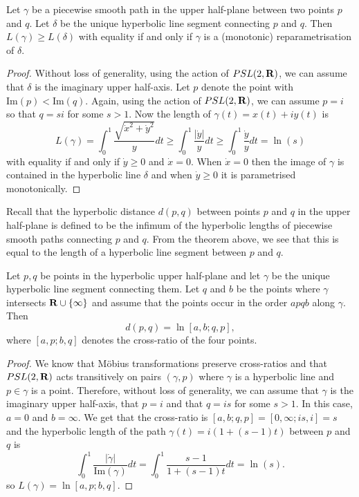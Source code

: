 \documentclass[12pt]{article}
\begin{document}
\begin{thm}
  Let $\gamma$ be a piecewise smooth path in the upper half-plane between two points $p$ and $q$. Let $\delta$ be the unique hyperbolic line segment connecting $p$ and $q$. Then $L(\gamma)\geq L(\delta)$ with equality if and only if $\gamma$ is a (monotonic) reparametrisation of $\delta$.
\end{thm}
\begin{proof}
  Without loss of generality, using the action of $PSL(2,\mathbf{R})$, we can assume that $\delta$ is the imaginary upper half-axis. Let $p$ denote the point with $\mathrm{Im}(p)<\mathrm{Im}(q)$. Again, using the action of $PSL(2,\mathbf{R})$, we can assume $p=i$ so that $q=si$ for some $s>1$. Now the length of $\gamma(t)=x(t)+iy(t)$ is
  \[L(\gamma)=\int_0^1\frac{\sqrt{\dot{x}^2+\dot{y}^2}}{y}dt\geq\int_0^1\frac{|\dot{y}|}{y}dt\geq\int_0^1\frac{\dot{y}}{y}dt=\ln(s)\]
  with equality if and only if $\dot{y}\geq 0$ and $\dot{x}=0$. When $\dot{x}=0$ then the image of $\gamma$ is contained in the hyperbolic line $\delta$ and when $\dot{y}\geq 0$ it is parametrised monotonically.
\end{proof}

Recall that the hyperbolic distance $d(p,q)$ between points $p$ and $q$ in the upper half-plane is defined to be the infimum of the hyperbolic lengths of piecewise smooth paths connecting $p$ and $q$. From the theorem above, we see that this is equal to the length of a hyperbolic line segment between $p$ and $q$.

\begin{cor}
  Let $p,q$ be points in the hyperbolic upper half-plane and let $\gamma$ be the unique hyperbolic line segment connecting them. Let $q$ and $b$ be the points where $\gamma$ intersects $\mathbf{R}\cup\{\infty\}$ and assume that the points occur in the order $apqb$ along $\gamma$. Then
  \[d(p,q)=\ln[a,b;q,p],\]
  where $[a,p;b,q]$ denotes the cross-ratio of the four points.
\end{cor}
\begin{proof}
  We know that M\"obius transformations preserve cross-ratios and that $PSL(2,\mathbf{R})$ acts transitively on pairs $(\gamma,p)$ where $\gamma$ is a hyperbolic line and $p\in\gamma$ is a point. Therefore, without loss of generality, we can assume that $\gamma$ is the imaginary upper half-axis, that $p=i$ and that $q=is$ for some $s>1$. In this case, $a=0$ and $b=\infty$. We get that the cross-ratio is $[a,b;q,p]=[0,\infty;is,i]=s$ and the hyperbolic length of the path $\gamma(t)=i(1+(s-1)t)$ between $p$ and $q$ is
  \[\int_0^1\frac{|\dot{\gamma}|}{\mathrm{Im}(\gamma)}dt=\int_0^1\frac{s-1}{1+(s-1)t}dt=\ln(s).\]
  so $L(\gamma)=\ln[a,p;b,q]$.
\end{proof}
\end{document}
